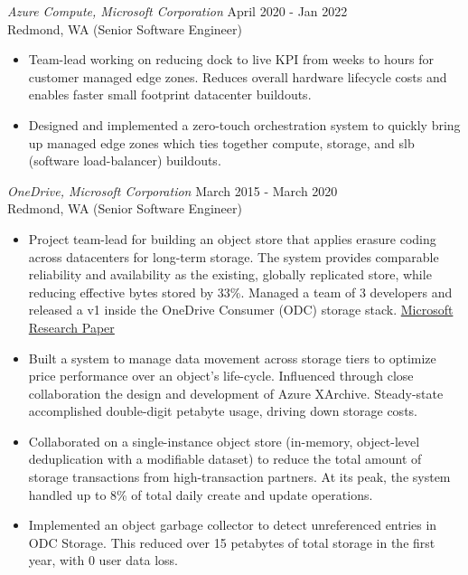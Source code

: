 \documentclass{res}
\begin{document}
\begin{resume}
{\sl Azure Compute, Microsoft Corporation} \hfill        {\small April 2020 - Jan 2022} \\
{\small Redmond, WA       \hfill   (Senior Software Engineer)}
   \begin{itemize} \itemsep -2pt %
   \item Team-lead working on reducing dock to live KPI from weeks to hours for customer managed edge zones. Reduces overall hardware lifecycle 
   costs and enables faster small footprint datacenter buildouts.
   \item Designed and implemented a zero-touch orchestration system to quickly bring up managed edge zones which ties together compute,
   storage, and slb (software load-balancer) buildouts.
 \end{itemize}
 
{\sl OneDrive, Microsoft Corporation} \hfill        {\small March 2015 - March 2020} \\
{\small Redmond, WA       \hfill   (Senior Software Engineer)}
   \begin{itemize} \itemsep -2pt %
   \item Project team-lead for building an object store that applies erasure coding across datacenters for long-term storage. 
   The system provides comparable reliability and availability as the existing, globally replicated store, while reducing effective bytes stored by 33\%.
   \newline   
    Managed a team of 3 developers and released a v1 inside the OneDrive Consumer (ODC) storage stack. 
  \href{https://www.usenix.org/system/files/conference/atc17/atc17-chen_yu_lin.pdf}{Microsoft Research Paper}
   \item Built a system to manage data movement across storage tiers to optimize price performance over an object's life-cycle. Influenced through close collaboration the design 
   and development of Azure XArchive. Steady-state accomplished double-digit petabyte usage, driving down storage costs.
  \item Collaborated on a single-instance object store (in-memory, object-level deduplication with a modifiable dataset) 
   to reduce the total amount of storage transactions from high-transaction partners. At its peak, the system handled 
   up to 8\% of total daily create and update operations.
  \item Implemented an object garbage collector to detect unreferenced entries in ODC Storage. 
   This reduced over 15 petabytes of total storage in the first year, with 0 user data loss.
 \end{itemize}
 

\end{resume}
\end{document}
